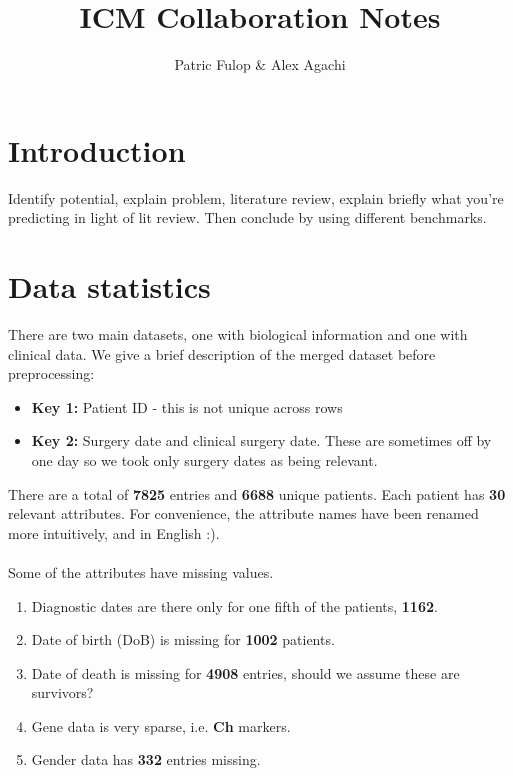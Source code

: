 \documentclass[a4paper]{article}
\title{ICM Collaboration Notes}
\author{Patric Fulop \& Alex Agachi}
\affil{The University of Edinburgh}
\begin{document}
\maketitle

\section{Introduction}
Identify potential, explain problem, literature review, explain briefly what you're predicting in light of lit review. Then conclude by using different benchmarks. 
\section{Data statistics}
There are two main datasets, one with biological information and one with clinical data. 
We give a brief description of the merged dataset before preprocessing:
%
\begin{itemize}
\item \textbf{Key 1:} Patient ID - this is not unique across rows
\item \textbf{Key 2:} Surgery date and clinical surgery date. 
These are sometimes off by one day so we took only surgery dates as being relevant.
\end{itemize}
%
There are a total of \textbf{7825} entries and \textbf{6688} unique patients. Each patient has \textbf{30} relevant attributes. For convenience, the attribute names have been renamed more intuitively, and in English :). \\
\\
Some of the attributes have missing values.
\begin{enumerate}
\item Diagnostic dates are there only for one fifth of the patients,  \textbf{1162}.
\item Date of birth (DoB) is missing for \textbf{1002} patients.
\item Date of death is missing for \textbf{4908} entries, should we assume these are survivors? 
\item Gene data is very sparse, i.e. \textbf{Ch} markers.
\item Gender data has \textbf{332} entries missing.
\end{enumerate}


\end{document}
